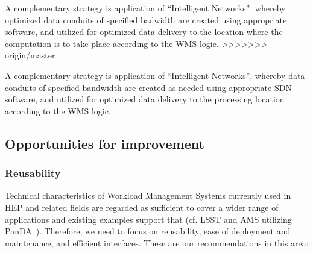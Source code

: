 A complementary strategy is application of ``Intelligent Networks'', whereby optimized data conduits of specified badwidth are created using
appropriate software, and utilized for optimized data delivery to the location where the computation is to take place according to the WMS logic.
>>>>>>> origin/master

A complementary strategy is application of ``Intelligent Networks'', whereby data conduits of specified bandwidth
are created as needed using appropriate SDN software, and utilized for optimized data delivery to the processing location
according to the WMS logic.


\subsection{Opportunities for improvement}


\subsubsection{Reusability}
Technical characteristics of Workload Management Systems currently used in HEP and related fields are regarded
as sufficient to cover a wider range of applications and existing examples support that (cf. LSST and AMS utilizing PanDA~\cite{pandamon_isgc14}).
Therefore, we need to focus on reusability, ease of deployment and maintenance, and efficient interfaces. These are our recommendations in this area:

